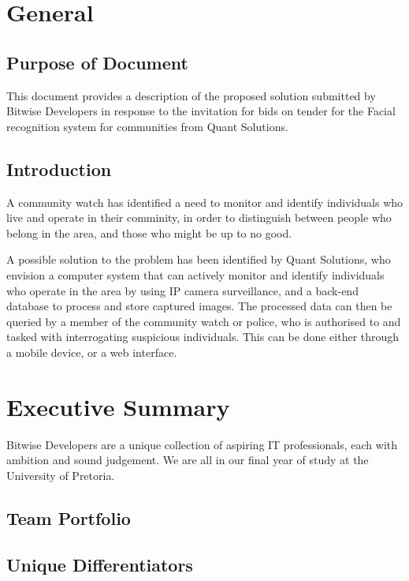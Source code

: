 \documentclass[a4paper]{article}
\begin{document}
	\section{General}
	
		\subsection{Purpose of Document}
		
		This document provides a description of the proposed solution submitted by Bitwise Developers in response to the invitation 
		for bids on tender for the Facial recognition system for communities from Quant Solutions.
		
		\subsection{Introduction}
		
		A community watch has identified a need to monitor and identify individuals who live and operate in their comminity, in order to 
		distinguish between people who belong in the area, and those who might be up to no good. 
		
		A possible solution to the problem has been identified by Quant Solutions, who envision a computer system that can actively monitor
		and identify individuals who operate in the area by using IP camera surveillance, and a back-end database to process and store captured
		images. The processed data can then be queried by a member of the community watch or police, who is authorised to and tasked with interrogating
		suspicious individuals. This can be done either through a mobile device, or a web interface.
		
	\section{Executive Summary}
	
	Bitwise Developers are a unique collection of aspiring IT professionals, each with ambition and sound judgement. 
	We are all in our final year of study at the University of Pretoria. 
	
		\subsection{Team Portfolio}
		
		
		\subsection{Unique Differentiators}
		
\end{document}
